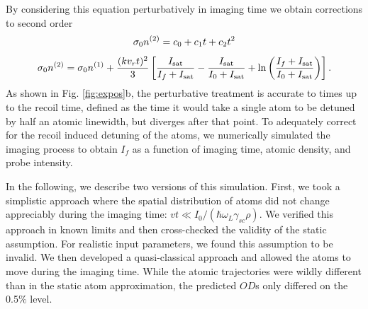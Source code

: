 \documentclass[12pt]{iopart}
\begin{document}
\par By considering this equation perturbatively in imaging time we obtain corrections to second order \cite{LJLthesis}
\begin{equation}
\sigma_0 n^{\rm{(2)}}=c_0+c_1t+c_2t^2
\end{equation}
\begin{equation}
\sigma_0 n^{\rm{(2)}}= \sigma_0 n^{\rm{(1)}}+\frac{(kv_rt)^2}{3}\left[\frac{I_{\rm{sat}}}{I_f+I_{\rm{sat}}}-\frac{I_{\rm{sat}}}{I_0+I_{\rm{sat}}}+\mathrm{ln}\left(\frac{I_f+I_{\rm{sat}}}{I_0+I_{\rm{sat}}}\right)\right].
\label{eq:OD2}
\end{equation}
As shown in  Fig. \ref{fig:expos}b, the perturbative treatment is accurate to times up to the recoil time, defined as the time it would take a single atom to be detuned by half an atomic linewidth, but diverges after that point. To adequately correct for the recoil induced detuning of the atoms, we numerically simulated the imaging process to obtain $I_f$ as a function of imaging time, atomic density, and probe intensity. 
\par In the following, we describe two versions of this simulation. First, we took a simplistic approach where the spatial distribution of atoms did not change appreciably during the imaging time: $vt\ll I_0/(\hbar \omega_L \gamma_{sc} \rho)$. We verified this approach in known limits and then cross-checked the validity of the static assumption. For realistic input parameters, we found this assumption to be invalid. We then developed a quasi-classical approach and allowed the atoms to move during the imaging time. While the atomic trajectories were wildly different than in the static atom approximation, the predicted $OD$s only differed on the 0.5$\%$ level. 
\end{document}
